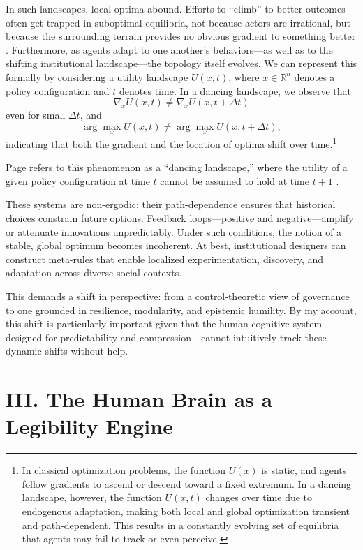\documentclass[12pt]{article}  %
\begin{document}
In such landscapes, local optima abound. Efforts to “climb” to better outcomes often get trapped in suboptimal equilibria, not because actors are irrational, but because the surrounding terrain provides no obvious gradient to something better \parencite{kauffman1993origins}. Furthermore, as agents adapt to one another’s behaviors—as well as to the shifting institutional landscape—the topology itself evolves. We can represent this formally by considering a utility landscape \( U(x, t) \), where \( x \in \mathbb{R}^n \) denotes a policy configuration and \( t \) denotes time. In a dancing landscape, we observe that
\[
\nabla_x U(x, t) \neq \nabla_x U(x, t + \Delta t)
\]
even for small \( \Delta t \), and
\[
\arg\max_x U(x, t) \neq \arg\max_x U(x, t + \Delta t),
\]
indicating that both the gradient and the location of optima shift over time.\footnote{In classical optimization problems, the function \( U(x) \) is static, and agents follow gradients to ascend or descend toward a fixed extremum. In a dancing landscape, however, the function \( U(x, t) \) changes over time due to endogenous adaptation, making both local and global optimization transient and path-dependent. This results in a constantly evolving set of equilibria that agents may fail to track or even perceive.}

Page refers to this phenomenon as a “dancing landscape,” where the utility of a given policy configuration at time \( t \) cannot be assumed to hold at time \( t+1 \) \parencite{page2011diversity}.

These systems are non-ergodic: their path-dependence ensures that historical choices constrain future options. Feedback loops—positive and negative—amplify or attenuate innovations unpredictably. Under such conditions, the notion of a stable, global optimum becomes incoherent. At best, institutional designers can construct meta-rules that enable localized experimentation, discovery, and adaptation across diverse social contexts.

This demands a shift in perspective: from a control-theoretic view of governance to one grounded in resilience, modularity, and epistemic humility. By my account, this shift is particularly important given that the human cognitive system—designed for predictability and compression—cannot intuitively track these dynamic shifts without help.

\section*{III. The Human Brain as a Legibility Engine}
\end{document}
